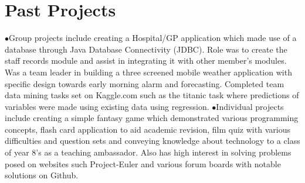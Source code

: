 \section*{Past Projects}  
\noindent $\bullet$Group projects include creating a Hospital/GP application which made use of a database through Java Database Connectivity (JDBC). Role was to create the staff records module and assist in integrating it with other member's modules. Was a team leader in building a three screened mobile weather application with specific design towards early morning alarm and forecasting. Completed team data mining tasks set on Kaggle.com such as the titanic task where predictions of variables were made using existing data using regression. \newline
\linebreak
$\bullet$Individual projects include creating a simple fantasy game which demonstrated various programming concepts, flash card application to aid academic revision, film quiz with various difficulties and question sets and conveying knowledge about technology to a class of year 8's as a teaching ambassador. Also has high interest in solving problems posed on websites such Project-Euler and various forum boards with notable solutions on Github.
